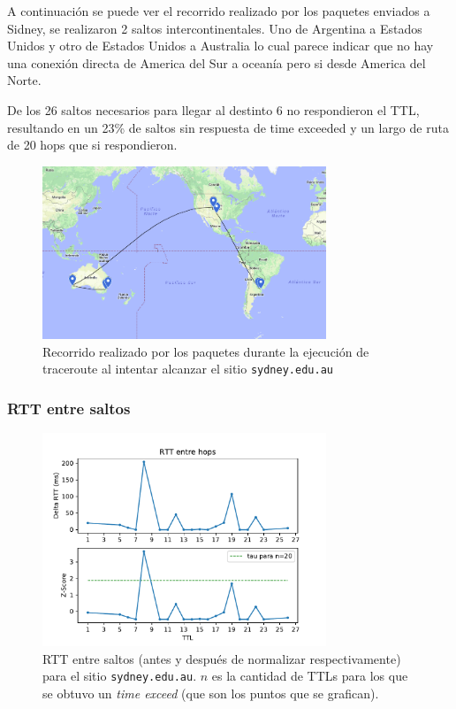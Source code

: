 A continuación se puede ver el recorrido realizado por los paquetes enviados a Sidney, se realizaron 2 saltos intercontinentales. Uno de Argentina a Estados Unidos y otro de Estados Unidos a Australia lo cual parece indicar que no hay una conexión directa de America del Sur a oceanía pero si desde America del Norte.

De los 26 saltos necesarios para llegar al destinto 6 no respondieron el TTL, resultando en un 23\% de saltos sin respuesta de time exceeded y un largo de ruta de 20 hops que si respondieron.

\begin{figure}[H]
  \centering
  \includegraphics[width=8.5cm]{figs/sidney.png}
  \caption{\footnotesize Recorrido realizado por los paquetes durante la ejecución de traceroute al intentar alcanzar el sitio \texttt{sydney.edu.au}}
\end{figure}

\subsubsection*{RTT entre saltos}

\begin{figure}[H]
  \centering
  \includegraphics[width=8.5cm]{figs/traceroute-sidney.pdf}
  \caption{\footnotesize RTT entre saltos (antes y después de normalizar respectivamente) para el sitio \texttt{sydney.edu.au}. $n$ es la cantidad de TTLs para los que se obtuvo un \emph{time exceed} (que son los puntos que se grafican).}
\end{figure}

